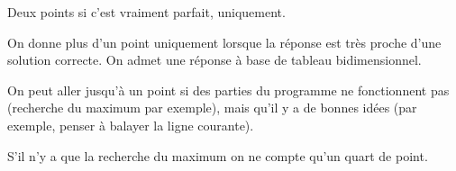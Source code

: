 \begin{correction}
\end{correction}
\begin{baremeenv}
Deux points si c'est vraiment parfait, uniquement.

On donne plus d'un point uniquement lorsque la réponse est très proche d'une solution correcte. On admet une réponse à base de tableau bidimensionnel.  

On peut aller jusqu'à un point si des parties du programme ne fonctionnent pas (recherche du maximum par exemple), mais qu'il y a de bonnes idées (par exemple, penser à balayer la ligne courante). 

S'il n'y a que la recherche du maximum on ne compte qu'un quart de point.  
\end{baremeenv}


